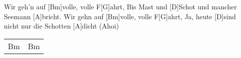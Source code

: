 \begin{guitar}
	\begin{highlightbar}
		 
		Wir geh'n auf [Bm]volle, volle F[G]ahrt, 
		Bis Mast und [D]Schot und mancher Seemann [A]bricht.
		Wir gehn auf [Bm]volle, volle F[G]ahrt,
		Ja, heute [D]sind nicht nur die Schotten [A]dicht (Ahoi)
	\end{highlightbar}
	
	 {\footnotesize\begin{tabular}{|l|l|}
		Bm & Bm
	\end{tabular}}
\end{guitar}